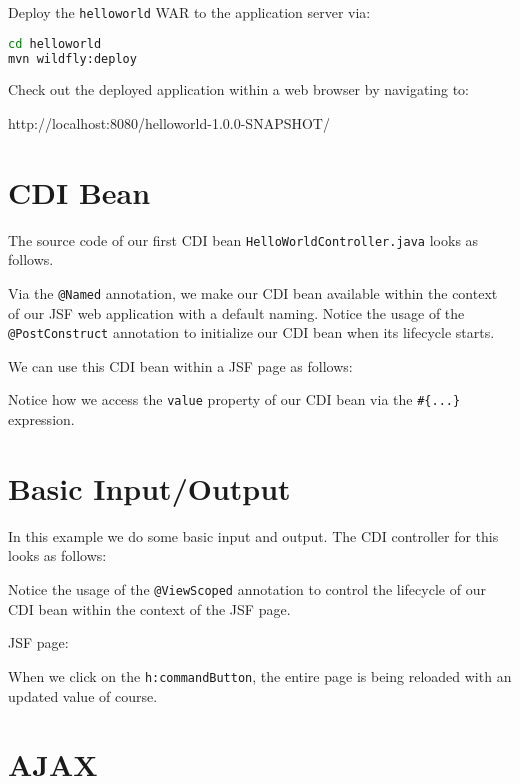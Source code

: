 Deploy the \texttt{helloworld} WAR to the application server via:
\begin{lstlisting}[language=bash]
cd helloworld
mvn wildfly:deploy
\end{lstlisting}

Check out the deployed application within a web browser by navigating to:

http://localhost:8080/helloworld-1.0.0-SNAPSHOT/

\section{CDI Bean}

The source code of our first CDI \cite{CDI2} bean \texttt{HelloWorldController.java} looks as follows.

Via the \texttt{@Named} annotation, we make our CDI bean available within the context of our JSF web application with a default naming.
Notice the usage of the \texttt{@PostConstruct} annotation to initialize our CDI bean when its lifecycle starts.

We can use this CDI bean within a JSF page as follows:


Notice how we access the \texttt{value} property of our CDI bean via the \texttt{\#\{...\}} expression.

\section{Basic Input/Output}

In this example we do some basic input and output.
The CDI controller for this looks as follows:


Notice the usage of the \texttt{@ViewScoped} annotation to control the lifecycle of our CDI bean within the context of the JSF page.

JSF page:


When we click on the \texttt{h:commandButton}, the entire page is being reloaded with an updated value of course.


\section{AJAX}

